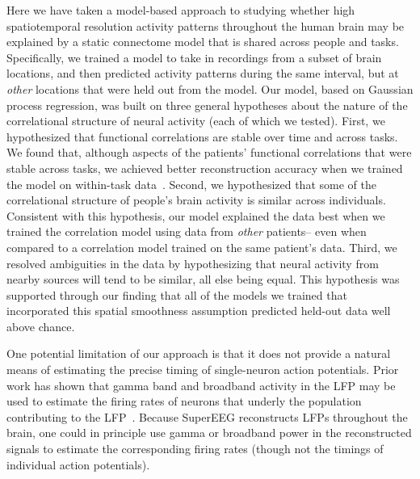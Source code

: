 \message{ !name(main.tex)}\documentclass[11pt]{article}
\begin{document}
{Here we have taken a model-based approach to studying whether high
spatiotemporal resolution activity patterns throughout the human brain
may be explained by a static connectome model that is shared across
people and tasks.  Specifically, we trained a model to take in
recordings from a subset of brain locations, and then predicted
activity patterns during the same interval, but at \textit{other}
locations that were held out from the model.  Our model, based on
Gaussian process regression, was built on three general hypotheses
about the nature of the correlational structure of neural activity
(each of which we tested).  First, we hypothesized that functional
correlations are stable over time and across tasks.  We found that,
although aspects of the patients' functional correlations that were
stable across tasks, we achieved better reconstruction accuracy when
we trained the model on within-task data~\citep[we acknowledge that
our general approach could potentially be extended to better model
across-task changes, following][and others]{ColeEtal16, TavoEtal16}.
Second, we hypothesized that some of the correlational structure of
people's brain activity is similar across individuals.  Consistent
with this hypothesis, our model explained the data best when we
trained the correlation model using data from \textit{other}
patients-- even when compared to a correlation model trained on the
same patient's data.  Third, we resolved ambiguities in the data by
hypothesizing that neural activity from nearby sources will tend to be
similar, all else being equal.  This hypothesis was supported through
our finding that all of the models we trained that incorporated this
spatial smoothness assumption predicted held-out data well above chance.

One potential limitation of our approach is that it does not provide a
natural means of estimating the precise timing of single-neuron action
potentials.  Prior work has shown that gamma band and broadband
activity in the LFP may be used to estimate the firing rates of
neurons that underly the population contributing to the
LFP~\cite{MillEtal08, MannEtal09, JacoEtal10, CronEtal11}.  Because
SuperEEG reconstructs LFPs throughout the brain, one could in
principle use gamma or broadband power in the reconstructed signals to
estimate the corresponding firing rates (though not the timings of
individual action potentials).

}
\end{document}
